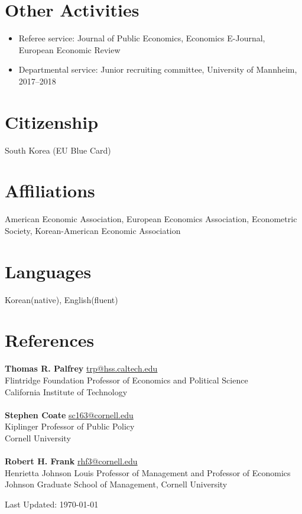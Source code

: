 \documentclass[margin, letterpaper]{res}
\begin{document}
\begin{resume}
\section{Other Activities}
\begin{itemize}
\item Referee service: Journal of Public Economics, Economics E-Journal, European Economic Review
\item Departmental service: Junior recruiting committee, University of Mannheim, 2017--2018
\end{itemize}

\section{Citizenship} South Korea (EU Blue Card)%

\section{Affiliations} American Economic Association, European Economics Association, Econometric Society, Korean-American Economic Association

\section{Languages} Korean(native), English(fluent)

\section{References} \textbf{Thomas R. Palfrey} \href{mailto:trp@hss.caltech.edu}{trp@hss.caltech.edu}\\
Flintridge Foundation Professor of Economics and Political Science\\
California Institute of Technology\\\\
\textbf{Stephen Coate} \href{mailto:sc163@cornell.edu}{sc163@cornell.edu}\\
Kiplinger Professor of Public Policy\\
Cornell University\\\\
\textbf{Robert H. Frank} \href{mailto:rhf3@cornell.edu}{rhf3@cornell.edu}\\
Henrietta Johnson Louis Professor of Management and Professor of Economics\\
Johnson Graduate School of Management, Cornell University
\begin{flushright}
Last Updated: \today
\end{flushright}
\end{resume} 
\end{document}
